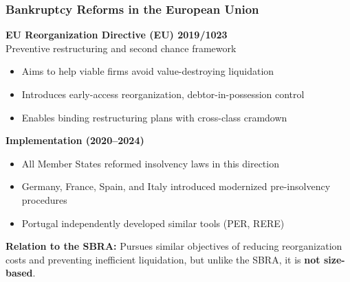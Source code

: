 \documentclass[aspectratio=169,xcolor=table]{beamer}
\begin{document}
\begin{frame}[label=EU_reforms] \frametitle{Bankruptcy Reforms in the European Union \hfill \hyperlink{SBRA}{}}

\textbf{EU Reorganization Directive (EU) 2019/1023}  \\
Preventive restructuring and second chance framework 

\begin{itemize} \small
    \item Aims to help viable firms avoid value-destroying liquidation 
    \item Introduces early-access reorganization, debtor-in-possession control
    \item Enables binding restructuring plans with cross-class cramdown
\end{itemize} \normalsize \vspace{2mm}

\textbf{Implementation (2020--2024)}
\begin{itemize} \small
    \item All Member States reformed insolvency laws in this direction
    \item Germany, France, Spain, and Italy introduced modernized pre-insolvency procedures
    \item Portugal independently developed similar tools (PER, RERE)
\end{itemize} \normalsize \vspace{2mm}

\small
\textbf{Relation to the SBRA:} Pursues similar objectives of reducing reorganization costs and preventing inefficient liquidation, but unlike the SBRA, it is \textbf{not size-based}.


\end{frame}
\end{document}
